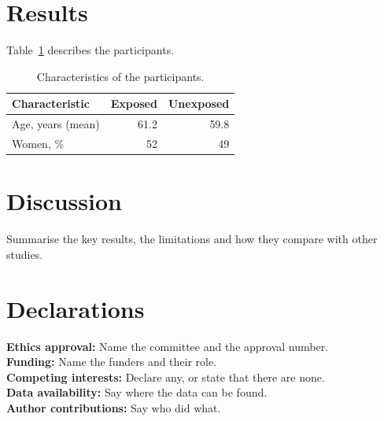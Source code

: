 \documentclass[11pt,a4paper]{article}
\begin{document}
\section{Results}
Table~\ref{tab:baseline} describes the participants.

\begin{table}[htbp]
  \centering
  \caption{Characteristics of the participants.}
  \label{tab:baseline}
  \begin{tabular}{lrr}
    \toprule
    Characteristic & Exposed & Unexposed \\
    \midrule
    Age, years (mean) & 61.2 & 59.8 \\
    Women, \% & 52 & 49 \\
    \bottomrule
  \end{tabular}
\end{table}

\section{Discussion}
Summarise the key results, the limitations and how they compare with other studies.

\section*{Declarations}
\noindent\textbf{Ethics approval:} Name the committee and the approval number.\\
\textbf{Funding:} Name the funders and their role.\\
\textbf{Competing interests:} Declare any, or state that there are none.\\
\textbf{Data availability:} Say where the data can be found.\\
\textbf{Author contributions:} Say who did what.



\end{document}
